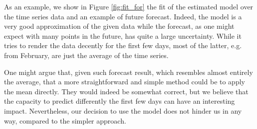 \documentclass[11pt,a4paper,final]{paper}
\begin{document}
As an example, we show in Figure \ref{fig:fit_for} the fit of the estimated model over the time series data and an example of future forecast. Indeed, the model is a very good approximation of the given data while the forecast, as one might expect with many points in the future, has quite a large uncertainty. While it tries to render the data decently for the first few days, most of the latter, e.g. from February, are just the average of the time series. 

One might argue that, given such forecast result, which resembles almost entirely the average, that a more straightforward and simple method could be to apply the mean directly. They would indeed be somewhat correct, but we believe that the capacity to predict differently the first few days can have an interesting impact. Nevertheless, our decision to use the model does not hinder us in any way, compared to the simpler approach.
\end{document}
